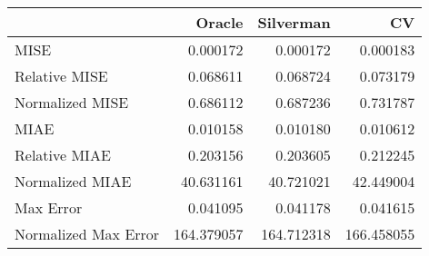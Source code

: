 \begin{tabular}{lrrr}
  \hline
 & Oracle & Silverman & CV \\ 
  \hline
MISE & 0.000172 & 0.000172 & 0.000183 \\ 
  Relative MISE & 0.068611 & 0.068724 & 0.073179 \\ 
  Normalized MISE & 0.686112 & 0.687236 & 0.731787 \\ 
  MIAE & 0.010158 & 0.010180 & 0.010612 \\ 
  Relative MIAE & 0.203156 & 0.203605 & 0.212245 \\ 
  Normalized MIAE & 40.631161 & 40.721021 & 42.449004 \\ 
  Max Error & 0.041095 & 0.041178 & 0.041615 \\ 
  Normalized Max Error & 164.379057 & 164.712318 & 166.458055 \\ 
   \hline
\end{tabular}
